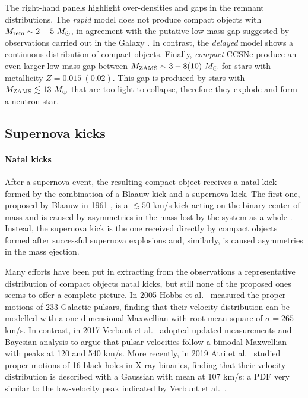 \documentclass[a4paper,titlepage]{book}     	%
\newcommand{\sun}{\ensuremath{_\odot}}
\newcommand{\mzams}{M_\textup{ZAMS}}
\newcommand{\msun}{\ensuremath{M\sun}}
\begin{document}
The right-hand panels highlight over-densities and gaps in the remnant distributions. The \emph{rapid} model does not produce compact objects with $M_{\rm rem} \sim 2-5~\msun$, in agreement with the putative low-mass gap suggested by observations carried out in the Galaxy \cite{massgapreal_ozel2010}. In contrast, the \emph{delayed} model shows a continuous distribution of compact objects. Finally, \emph{compact} CCSNe produce an even larger low-mass gap between $\mzams \sim 3-8(10)~\msun $ for stars with metallicity $Z=0.015~(0.02)$. This gap is produced by stars with $\mzams \lesssim 13~\msun$ that are too light to collapse, therefore they explode and form a neutron star.





\subsection{Supernova kicks}\label{subsec:kicksSEVN}
\paragraph{Natal kicks} After a supernova event, the resulting compact object receives a natal kick formed by the combination of a Blaauw kick and a supernova kick. The first one, proposed by Blaauw in 1961 \cite{Blaauw1961}, is a $\lesssim 50$ km/s kick acting on the binary center of mass and is caused by asymmetries in the mass lost by the system as a whole \cite{Mandel2016_kicks}. Instead, the supernova kick is the one received directly by compact objects formed after successful supernova explosions and, similarly, is caused asymmetries in the mass ejection. 


Many efforts have been put in extracting from the observations a representative distribution of compact objects natal kicks, but still none of the proposed ones seems to offer a complete picture. In 2005 Hobbs et al.\ \cite{Hobbs2005} measured the proper motions of 233 Galactic pulsars, finding that their velocity distribution can be modelled with a one-dimensional Maxwellian with root-mean-square of $\sigma = 265$ km/s. In contrast, in 2017 Verbunt et al.\ \cite{Verbunt2017_bimodalkicks} adopted updated measurements and Bayesian analysis to argue that pulsar velocities follow a bimodal Maxwellian with peaks at 120 and 540 km/s. More recently, in 2019 Atri et al.\ \cite{Atri2019_kicks} studied proper motions of 16 black holes in X-ray binaries, finding that their velocity distribution is described with a Gaussian with mean at 107 km/s: a PDF very similar to the low-velocity peak indicated by Verbunt et al.\ \cite{Verbunt2017_bimodalkicks}.\\
\end{document}
